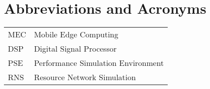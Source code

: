 \chapter*{Abbreviations and Acronyms}


\noindent
\begin{longtable}{@{}p{}p{}@{}}
MEC & Mobile Edge Computing \\
DSP & Digital Signal Processor \\
PSE & Performance Simulation Environment \\
RNS & Resource Network Simulation

\end{longtable}
